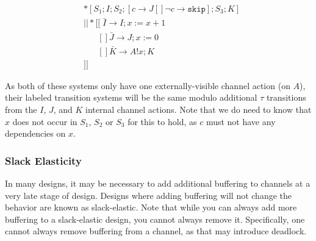 \documentclass[times, 10pt]{article}
\begin{document}
\begin{align*}
& *[S_1; I; S_2; [ c \rightarrow J [] \lnot c \rightarrow \texttt{skip} ]; S_3; K] \\
& || *[[\;\bar{I} \rightarrow I; x := x + 1 \\
&\;\;\;\;\;\;[] \bar{J} \rightarrow J; x := 0 \\
&\;\;\;\;\;\;[] \bar{K} \rightarrow  A!x; K \\
&]]
\end{align*}

As both of these systems only have one externally-visible channel action (on
$A$), their labeled transition systems will be the same modulo additional $\tau$
transitions from the $I$, $J$, and $K$ internal channel actions. Note that we do
need to know that $x$ does not occur in $S_1$, $S_2$ or $S_3$ for this to hold,
as $c$ must not have any dependencies on $x$.

\subsubsection{Slack Elasticity}

In many designs, it may be necessary to add additional buffering to channels at
a very late stage of design. Designs where adding buffering will not change the
behavior are known as slack-elastic. Note that while you can always add more
buffering to a slack-elastic design, you cannot always remove it. Specifically,
one cannot always remove buffering from a channel, as that may introduce
deadlock.
\end{document}
